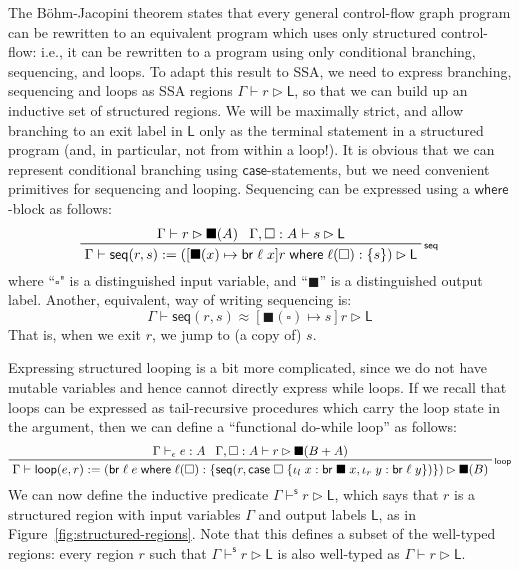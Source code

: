 \documentclass[acmsmall,screen,review]{acmart}
\newcommand{\ms}[1]{\ensuremath{\mathsf{#1}}}
\newcommand{\lto}{:}
\newcommand{\linl}[1]{\iota_l\;{#1}}
\newcommand{\linr}[1]{\iota_r\;{#1}}
\newcommand{\brb}[2]{\ms{br}\;#1\;#2}
\newcommand{\casestmt}[5]{\ms{case}\;#1\;\{\linl{#2} \lto #3, \linr{#4} \lto #5\}}
\newcommand{\where}[2]{#1\;\ms{where}\;#2}
\newcommand{\wbranch}[3]{#1(#2) \lto \{#3\}}
\newcommand{\bhyp}[2]{#1 : #2}
\newcommand{\rle}[1]{{\scriptsize\textsf{#1}}}
\newcommand{\hasty}[4]{#1 \vdash_{#2} #3: {#4}}
\newcommand{\haslb}[3]{#1 \vdash #2 \rhd #3}
\newcommand{\shaslb}[3]{#1 \vdash^{\ms{s}} #2 \rhd #3}
\newcommand{\teqv}{\approx}
\newcommand{\lbeq}[4]{#1 \vdash #2 \teqv #3 \rhd {#4}}
\newcommand{\invar}{\square}
\newcommand{\outlb}{\blacksquare}
\begin{document}
The B\"ohm-Jacopini theorem states that every general control-flow graph program can be rewritten to
an equivalent program which uses only structured control-flow: i.e., it can be rewritten to a program
using only conditional branching, sequencing, and loops. To adapt this result to SSA, we
need to express branching, sequencing and loops as SSA regions $\haslb{\Gamma}{r}{\ms{L}}$, 
so that we can build up an inductive set of structured regions. We will be maximally strict, and
allow branching to an exit label in $\ms{L}$ only as the terminal statement in a structured program
(and, in particular, not from within a loop!). It is obvious that we can represent conditional
branching using \ms{case}-statements, but we need convenient primitives for sequencing and looping.
Sequencing can be expressed using a \ms{where}-block as follows:
\begin{equation}
  \prftree[r]{\rle{seq}}
    {\haslb{\Gamma}{r}{\outlb(A)}}
    {\haslb{\Gamma, \bhyp{\invar}{A}}{s}{\ms{L}}}
    {\haslb{\Gamma}{\ms{seq}(r, s) 
      := (\where{[\outlb(x) \mapsto \brb{\ell}{x}]r}{\wbranch{\ell}{\invar}{s}})}{\ms{L}}}
\end{equation}
where ``$\invar$" is a distinguished input variable, and ``$\outlb$'' is a distinguished output
label. Another, equivalent, way of writing sequencing is: 
\begin{equation}
  \lbeq{\Gamma}{\ms{seq}(r, s)}{[\outlb(\invar) \mapsto s]r}{\ms{L}}
\end{equation}
That is, when we exit $r$, we jump to (a copy of) $s$. 

Expressing structured looping is a bit more complicated, since we do not have
mutable variables and hence cannot directly express while loops. If we recall that loops
can be expressed as tail-recursive procedures which carry the loop state in the argument,
then we can define a ``functional do-while loop'' as follows: 
\begin{equation}
  \prftree[r]{\rle{loop}}
    {\hasty{\Gamma}{\epsilon}{e}{A}}
    {\haslb{\Gamma, \bhyp{\invar}{A}}{r}{\outlb(B + A)}}
    {\haslb{\Gamma}{\ms{loop}(e, r) 
      := (\where{\brb{\ell}{e}}{\wbranch{\ell}{\invar}
        {\ms{seq}(r, \casestmt{\invar}{x}{\brb{\outlb}{x}}{y}{\brb{\ell}{y}})}})}{\outlb(B)}}
\end{equation}
%
We can now define the inductive predicate
$\shaslb{\Gamma}{r}{\ms{L}}$, which says that $r$ is a structured
region with input variables $\Gamma$ and output labels $\ms{L}$, as in
Figure~\ref{fig:structured-regions}. Note that this defines a subset of the
well-typed regions: every region $r$ such that
$\shaslb{\Gamma}{r}{\ms{L}}$ is also well-typed as $\haslb{\Gamma}{r}{\ms{L}}$.
\end{document}
